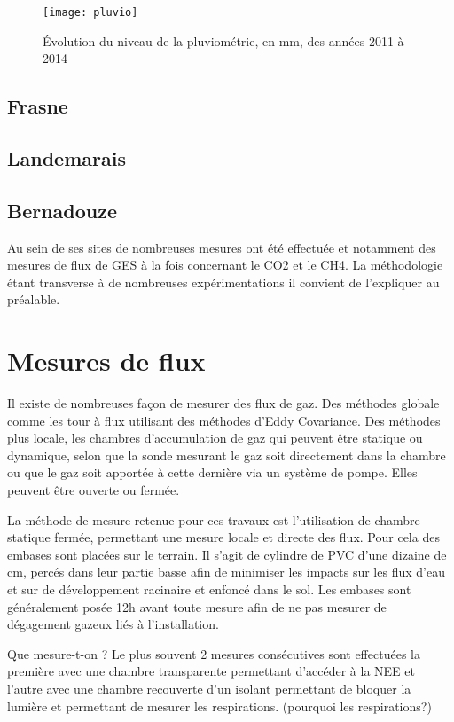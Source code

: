 \begin{figure}
\centering
\texttt{[image: pluvio]}
\caption{Évolution du niveau de la pluviométrie, en \si{\mm}, des années 2011 à 2014}
\label{fig:pluvio}
\end{figure}


\subsection{Frasne}

\subsection{Landemarais}

\subsection{Bernadouze}


Au sein de ses sites de nombreuses mesures ont été effectuée et notamment des mesures de flux de GES à la fois concernant le CO2 et le CH4. La méthodologie étant transverse à de nombreuses expérimentations il convient de l'expliquer au préalable.

\section{Mesures de flux}
\label{sec:clsd_chbr_method}

Il existe de nombreuses façon de mesurer des flux de gaz. 
Des méthodes globale comme les tour à flux utilisant des méthodes d'Eddy Covariance. 
Des méthodes plus locale, les chambres d'accumulation de gaz qui peuvent être statique ou dynamique, selon que la sonde mesurant le gaz soit directement dans la chambre ou que le gaz soit apportée à cette dernière via un système de pompe. Elles peuvent être ouverte ou fermée.

La méthode de mesure retenue pour ces travaux est l'utilisation de chambre statique fermée, permettant une mesure locale et directe des flux.
Pour cela des embases sont placées sur le terrain. Il s'agit de cylindre de PVC d'une dizaine de cm, percés dans leur partie basse afin de minimiser les impacts sur les flux d'eau et sur de développement racinaire et enfoncé dans le sol.
Les embases sont généralement posée 12h avant toute mesure afin de ne pas mesurer de dégagement gazeux liés à l'installation.

Que mesure-t-on ?
Le plus souvent 2 mesures consécutives sont effectuées la première avec une chambre transparente permettant d'accéder à la NEE et l'autre avec une chambre recouverte d'un isolant permettant de bloquer la lumière et permettant de mesurer les respirations. (pourquoi les respirations?)

